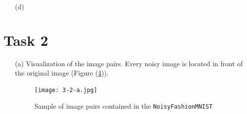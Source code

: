 \documentclass [a4paper, 11pt] {article}
\begin{document}
\begin{enumerate}
\begin{lstlisting}
BatchNorm2d-35            [-1, 512, 2, 2]           1,024
ReLU-36            [-1, 512, 2, 2]               0
Conv2d-37            [-1, 512, 2, 2]       2,359,808
BatchNorm2d-38            [-1, 512, 2, 2]           1,024
ReLU-39            [-1, 512, 2, 2]               0
Conv2d-40           [-1, 1024, 1, 1]       4,719,616
BatchNorm2d-41           [-1, 1024, 1, 1]           2,048
ReLU-42           [-1, 1024, 1, 1]               0
Conv2d-43           [-1, 1024, 1, 1]       9,438,208
BatchNorm2d-44           [-1, 1024, 1, 1]           2,048
ReLU-45           [-1, 1024, 1, 1]               0
Conv2d-46           [-1, 1024, 1, 1]       9,438,208
BatchNorm2d-47           [-1, 1024, 1, 1]           2,048
ReLU-48           [-1, 1024, 1, 1]               0
Linear-49                   [-1, 10]          10,250
================================================================
Total params: 30,292,490
Trainable params: 30,292,490
Non-trainable params: 0
----------------------------------------------------------------
Input size (MB): 0.00
Forward/backward pass size (MB): 1.45
Params size (MB): 115.56
Estimated Total Size (MB): 117.01
----------------------------------------------------------------
\end{lstlisting}


\begin{figure}[!h]
	\centering
	\begin{subfigure}{0.7\textwidth}
		\centering
		\texttt{[image: 3-1-c-train.png]}
		\caption{Training accuracy curve}
		\label{fig:2a}
	\end{subfigure}
	\begin{subfigure}{0.7\textwidth}
		\centering
		\texttt{[image: 3-1-c-valid.png]}
		\caption{Validation accuracy curve}
		\label{fig:2b}
	\end{subfigure}
	\caption{Plot of results from task 3.1.c)}
	\label{fig:2}
\end{figure}

As we can see from the plots (Figure \ref{fig:2}) it seems that our network overfits the data and it could benefit from early stopping.


\item[(d)]

\end{enumerate}

\section*{Task 2}
\begin{enumerate}
	\item[(a)] Visualization of the image pairs. Every noisy image is located in front of the original image (Figure (\ref{fig:2-a})).
	
	\begin{figure}[!h]
		\centering
		\texttt{[image: 3-2-a.jpg]}
		\caption{Sample of image pairs contained in the \texttt{NoisyFashionMNIST}}
		\label{fig:2-a}
	\end{figure}
\end{enumerate}
	
\end{document}
